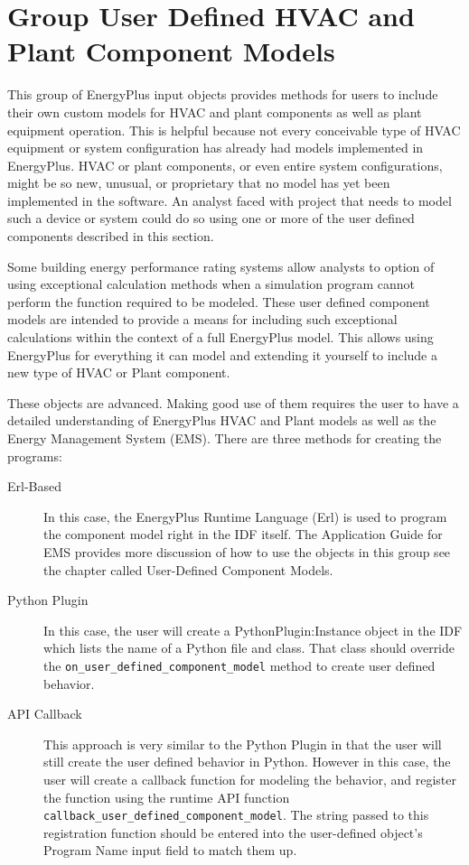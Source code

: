 \section{Group User Defined HVAC and Plant Component Models}\label{group-user-defined-hvac-and-plant-component-models}

This group of EnergyPlus input objects provides methods for users to include their own custom models for HVAC and plant components as well as plant equipment operation. This is helpful because not every conceivable type of HVAC equipment or system configuration has already had models implemented in EnergyPlus. HVAC or plant components, or even entire system configurations, might be so new, unusual, or proprietary that no model has yet been implemented in the software. An analyst faced with project that needs to model such a device or system could do so using one or more of the user defined components described in this section.

Some building energy performance rating systems allow analysts to option of using exceptional calculation methods when a simulation program cannot perform the function required to be modeled. These user defined component models are intended to provide a means for including such exceptional calculations within the context of a full EnergyPlus model. This allows using EnergyPlus for everything it can model and extending it yourself to include a new type of HVAC or Plant component.

These objects are advanced. Making good use of them requires the user to have a detailed understanding of EnergyPlus HVAC and Plant models as well as the Energy Management System (EMS). There are three methods for creating the programs:

\begin{description}
  \item[Erl-Based] In this case, the EnergyPlus Runtime Language (Erl) is used to program the component model right in the IDF itself. The Application Guide for EMS provides more discussion of how to use the objects in this group see the chapter called User-Defined Component Models.
  \item[Python Plugin] In this case, the user will create a PythonPlugin:Instance object in the IDF which lists the name of a Python file and class.  That class should override the \texttt{on\_user\_defined\_component\_model} method to create user defined behavior.
  \item[API Callback] This approach is very similar to the Python Plugin in that the user will still create the user defined behavior in Python.  However in this case, the user will create a callback function for modeling the behavior, and register the function using the runtime API function \texttt{callback\_user\_defined\_component\_model}.  The string passed to this registration function should be entered into the user-defined object's Program Name input field to match them up.
\end{description}

